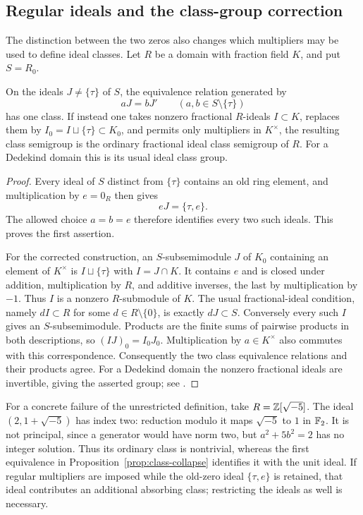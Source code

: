 \subsection{Regular ideals and the class-group correction}
The distinction between the two zeros also changes which multipliers may be used to define ideal classes. Let $R$ be a domain with fraction field $K$, and put $S=R_0$.

\begin{proposition}\label{prop:class-collapse}
On the ideals $J\ne\{\tau\}$ of $S$, the equivalence relation generated by
\[
 aJ=bJ'\qquad(a,b\in S\setminus\{\tau\})
\]
has one class. If instead one takes nonzero fractional $R$-ideals $I\subset K$, replaces them by $I_0=I\sqcup\{\tau\}\subset K_0$, and permits only multipliers in $K^\times$, the resulting class semigroup is the ordinary fractional ideal class semigroup of $R$. For a Dedekind domain this is its usual ideal class group.
\end{proposition}
\begin{proof}
Every ideal of $S$ distinct from $\{\tau\}$ contains an old ring element, and multiplication by $e=0_R$ then gives
\[
 eJ=\{\tau,e\}.
\]
The allowed choice $a=b=e$ therefore identifies every two such ideals. This proves the first assertion.

For the corrected construction, an $S$-subsemimodule $J$ of $K_0$ containing an element of $K^\times$ is $I\sqcup\{\tau\}$ with $I=J\cap K$. It contains $e$ and is closed under addition, multiplication by $R$, and additive inverses, the last by multiplication by $-1$. Thus $I$ is a nonzero $R$-submodule of $K$. The usual fractional-ideal condition, namely $dI\subset R$ for some $d\in R\setminus\{0\}$, is exactly $dJ\subset S$. Conversely every such $I$ gives an $S$-subsemimodule. Products are the finite sums of pairwise products in both descriptions, so $(IJ)_0=I_0J_0$. Multiplication by $a\in K^\times$ also commutes with this correspondence. Consequently the two class equivalence relations and their products agree. For a Dedekind domain the nonzero fractional ideals are invertible, giving the asserted group; see \citet[Theorem 3.20, p.\ 53]{MilneANT}.
\end{proof}

For a concrete failure of the unrestricted definition, take $R=\mathbb Z[\sqrt{-5}]$. The ideal $(2,1+\sqrt{-5})$ has index two: reduction modulo it maps $\sqrt{-5}$ to $1$ in $\mathbb F_2$. It is not principal, since a generator would have norm two, but $a^2+5b^2=2$ has no integer solution. Thus its ordinary class is nontrivial, whereas the first equivalence in Proposition~\ref{prop:class-collapse} identifies it with the unit ideal. If regular multipliers are imposed while the old-zero ideal $\{\tau,e\}$ is retained, that ideal contributes an additional absorbing class; restricting the ideals as well is necessary.

